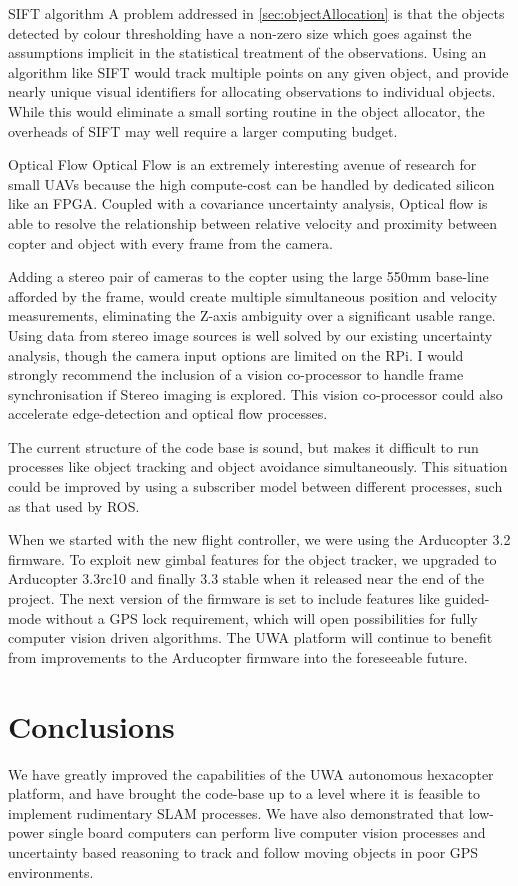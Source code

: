 \documentclass[a4paper, 11pt, titlepage]{article}
\begin{document}
  SIFT algorithm
  A problem addressed in \ref{sec:objectAllocation} is that the objects detected by colour thresholding have a non-zero size which goes against the assumptions implicit in the statistical treatment of the observations.  Using an algorithm like SIFT would track multiple points on any given object, and provide nearly unique visual identifiers for allocating observations to individual objects.  While this would eliminate a small sorting routine in the object allocator, the overheads of SIFT may well require a larger computing budget.

  Optical Flow
  Optical Flow is an extremely interesting avenue of research for small UAVs because the high compute-cost can be handled by dedicated silicon like an FPGA.  Coupled with a covariance uncertainty analysis, Optical flow is able to resolve the relationship between relative velocity and proximity between copter and object with every frame from the camera.  

  Adding a stereo pair of cameras to the copter using the large 550mm base-line afforded by the frame, would create multiple simultaneous position and velocity measurements, eliminating the Z-axis ambiguity over a significant usable range.  
  Using data from stereo image sources is well solved by our existing uncertainty analysis, though the camera input options are limited on the RPi. I would strongly recommend the inclusion of a vision co-processor to handle frame synchronisation if Stereo imaging is explored.  This vision co-processor could also accelerate edge-detection and optical flow processes.

  The current structure of the code base is sound, but makes it difficult to run processes like object tracking and object avoidance simultaneously.  This situation could be improved by using a subscriber model between different processes, such as that used by ROS.

  When we started with the new flight controller, we were using the Arducopter 3.2 firmware. To exploit new gimbal features for the object tracker, we upgraded to Arducopter 3.3rc10 and finally 3.3 stable when it released near the end of the project.  The next version of the firmware is set to include features like guided-mode without a GPS lock requirement, which will open possibilities for fully computer vision driven algorithms.  The UWA platform will continue to benefit from improvements to the Arducopter firmware into the foreseeable future.

\section{Conclusions}
  We have greatly improved the capabilities of the UWA autonomous hexacopter platform, and have brought the code-base up to a level where it is feasible to implement rudimentary SLAM processes.
  We have also demonstrated that low-power single board computers can perform live computer vision processes and uncertainty based reasoning to track and follow moving objects in poor GPS environments. 
\end{document}
